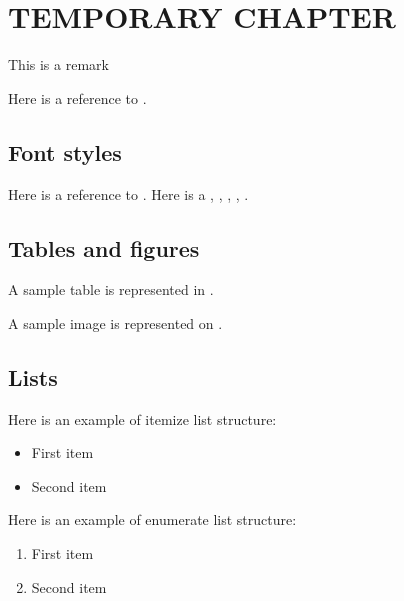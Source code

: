 \section{TEMPORARY CHAPTER}

\newline
\begin{remarks}
This is a remark
\end{remarks}

Here is a reference to .

\subsection{Font styles}

Here is a reference to .
Here is a , , , , .

\subsection{Tables and figures}

A sample table is represented in .


A sample image is represented on .


\subsection{Lists}

Here is an example of itemize list structure:
\begin{itemize}
	\item First item
	\item Second item
\end{itemize}

Here is an example of enumerate list structure:
\begin{enumerate}
	\item First item
	\item Second item
\end{enumerate}

